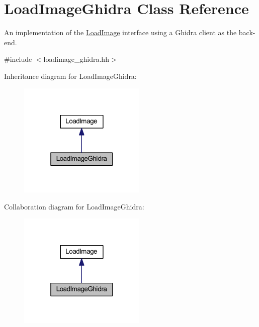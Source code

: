\hypertarget{class_load_image_ghidra}{}\section{Load\+Image\+Ghidra Class Reference}
\label{class_load_image_ghidra}


An implementation of the \mbox{\hyperlink{class_load_image}{Load\+Image}} interface using a Ghidra client as the back-\/end.  




{\ttfamily \#include $<$loadimage\+\_\+ghidra.\+hh$>$}



Inheritance diagram for Load\+Image\+Ghidra\+:
\nopagebreak
\begin{figure}[H]
\begin{center}
\leavevmode
\includegraphics[width=172pt]{class_load_image_ghidra__inherit__graph}
\end{center}
\end{figure}


Collaboration diagram for Load\+Image\+Ghidra\+:
\nopagebreak
\begin{figure}[H]
\begin{center}
\leavevmode
\includegraphics[width=172pt]{class_load_image_ghidra__coll__graph}
\end{center}
\end{figure}
